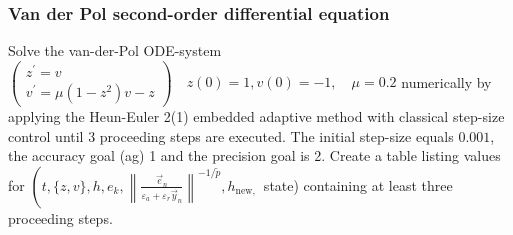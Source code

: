 \subsubsection{Van der Pol second-order differential equation}
Solve the van-der-Pol ODE-system $\left(\begin{array}{l}z^{\prime}=v \\ v^{\prime}=\mu\left(1-z^2\right) v-z\end{array}\right) \quad z(0)=1, v(0)=-1, \quad \mu=0.2$ numerically by applying the Heun-Euler 2(1) embedded adaptive method with classical step-size control until 3 proceeding steps are executed. The initial step-size equals $0.001$, the accuracy goal (ag) 1 and the precision goal is 2.
Create a table listing values for $\left(t,\{z, v\}, h, e_k,\left\|\frac{\vec{e}_n}{\varepsilon_a+\varepsilon_r \vec{y}_n}\right\|^{-1 / \tilde{p}}, h_{\text {new, }}\right.$ state) containing at least three proceeding steps.

